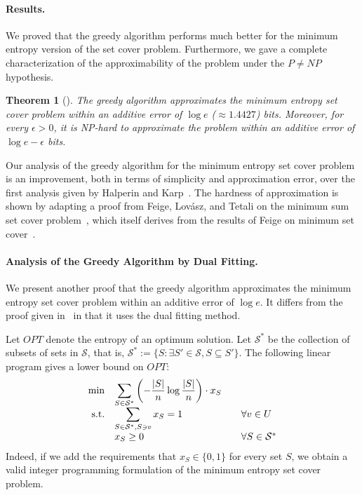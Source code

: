 \documentclass[10pt,a4paper]{article}
\newcommand{\ds}{\displaystyle}
\newtheorem{theorem}{Theorem}
\begin{document}
\paragraph{Results.}

We proved that the greedy algorithm performs much better for the minimum entropy version of the set cover problem. Furthermore, we gave a complete characterization of the approximability of the problem under the $P\not= NP$ hypothesis.

\begin{theorem}[\cite{CFJ08a}]
\label{thm:apxsc}
The greedy algorithm approximates the minimum entropy set cover problem within an additive error of $\log e$ ($\approx 1.4427$) bits. Moreover, for every $\epsilon > 0$, it is NP-hard to approximate the problem within an additive error of $\log e - \epsilon$ bits.
\end{theorem}

Our analysis of the greedy algorithm for the minimum entropy set cover problem is an improvement, both in terms of simplicity and approximation error, over the first analysis given by Halperin and Karp~\cite{HK05}. The hardness of approximation is shown by adapting a proof from Feige, Lov\'asz, and Tetali on the minimum sum set cover problem~\cite{FLT04}, which itself derives from the results of Feige on minimum set cover~\cite{F98}.

\paragraph{Analysis of the Greedy Algorithm by Dual Fitting.}

We present another proof that 
the greedy algorithm approximates the minimum entropy set cover 
problem within an additive error of $\log e$. 
It differs from the proof given in~\cite{CFJ08a} 
in that it uses the dual fitting method.

Let $OPT$ denote the entropy of an optimum solution.
Let $\mathcal{S}^{*}$ be the collection of subsets of sets in $\mathcal{S}$, that is,
$\mathcal{S}^{*} := \{S: \exists S' \in \mathcal{S}, S \subseteq S'\}$. 
The following linear program gives a lower bound on $OPT$:
\begin{equation}
\label{primal}
\begin{array}{rl@{\qquad}l}
\min          &\ds \sum_{S \in \mathcal{S}^{*}} 
\left(-\frac{|S|}{n}\log \frac{|S|}{n}\right) \cdot x_{S} \\[2ex]
\textrm{s.t.} &\ds \sum_{S \in \mathcal{S}^{*}, S \ni v} x_{S} = 1 & \forall v\in U \\[2ex]
&\ds x_{S} \geq 0 & \forall S \in \mathcal{S}^{*}
\end{array}
\end{equation}
Indeed, if we add the requirements that $x_{S} \in \{0, 1\}$ for every set $S$, 
we obtain a valid integer programming formulation of the minimum entropy set cover problem.
\end{document}
